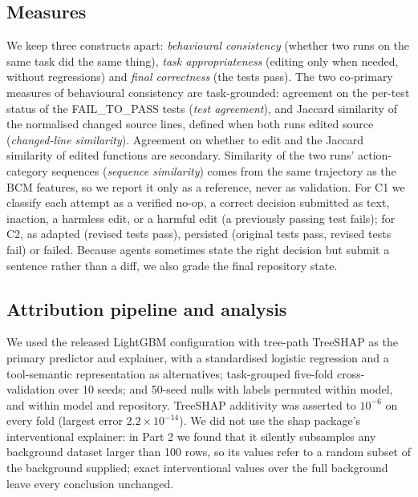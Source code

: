 \documentclass[conference]{IEEEtran}
\newcommand{\bcm}{\textsc{BCM}}
\begin{document}
\subsection{Measures}
We keep three constructs apart: \emph{behavioural consistency} (whether two runs on the same task did the same thing), \emph{task appropriateness} (editing only when needed, without regressions) and \emph{final correctness} (the tests pass). The two co-primary measures of behavioural consistency are task-grounded: agreement on the per-test status of the FAIL\_TO\_PASS tests (\emph{test agreement}), and Jaccard similarity of the normalised changed source lines, defined when both runs edited source (\emph{changed-line similarity}). Agreement on whether to edit and the Jaccard similarity of edited functions are secondary. Similarity of the two runs' action-category sequences (\emph{sequence similarity}) comes from the same trajectory as the \bcm{} features, so we report it only as a reference, never as validation. For C1 we classify each attempt as a verified no-op, a correct decision submitted as text, inaction, a harmless edit, or a harmful edit (a previously passing test fails); for C2, as adapted (revised tests pass), persisted (original tests pass, revised tests fail) or failed. Because agents sometimes state the right decision but submit a sentence rather than a diff, we also grade the final repository state.

\subsection{Attribution pipeline and analysis}
We used the released LightGBM configuration with tree-path TreeSHAP as the primary predictor and explainer, with a standardised logistic regression and a tool-semantic representation as alternatives; task-grouped five-fold cross-validation over 10 seeds; and 50-seed nulls with labels permuted within model, and within model and repository. TreeSHAP additivity was asserted to $10^{-6}$ on every fold (largest error $2.2\times10^{-14}$). We did not use the shap package's interventional explainer: in Part 2 we found that it silently subsamples any background dataset larger than 100 rows, so its values refer to a random subset of the background supplied; exact interventional values over the full background leave every conclusion unchanged.
\end{document}
